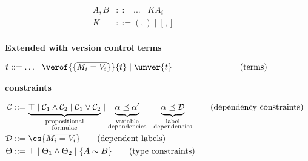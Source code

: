 \begin{figure}[tb]
\begin{minipage}{\textwidth}
\begin{minipage}{.52\textwidth}
\begin{align*}
          \end{align*}
        \end{minipage}
        \begin{minipage}{.44\textwidth}
          \begin{align*}
            A, B & ::= ... \mid K \overline{A_i} \tag{types}\\
            K    & ::= (,) \mid [,] \tag{type constructors}\\
          \end{align*}
        \end{minipage}
    \end{minipage}
    \begin{minipage}{.9\textwidth}
        \medskip\textbf{Extended with version control terms}
    \end{minipage}
    \begin{minipage}{\textwidth}
        \vspace{-.5\baselineskip}
        \begin{minipage}{\textwidth}
          \begin{align*}
            t & ::= \ldots \mid \verof{\{\overline{M_i=V_i}\}}{t} \mid \unver{t}\hspace{6em}\tag{terms}
          \end{align*}
        \end{minipage}
    \end{minipage}
    \begin{minipage}{.9\textwidth}
        \medskip\textbf{\vlmini{} constraints}
    \end{minipage}
    \begin{minipage}{\textwidth}
      \vspace{-.5\baselineskip}
      \begin{align*}
        \mathcal{C} & ::= \underbrace{\top \mid \mathcal{C}_1 \land \mathcal{C}_2 \mid \mathcal{C}_1 \lor \mathcal{C}_2}_{\substack{\text{propositional}\\\text{formulae}}} \mid \underbrace{\vphantom{\mid}\alpha \preceq \alpha'}_{\substack{\text{variable}\\\text{dependencies}}} \mid \underbrace{\vphantom{\mid}\alpha \preceq \mathcal{D}}_{\substack{\text{label}\\\text{dependencies}}}\tag{dependency 
 constraints}\\
        \mathcal{D} & ::= \cs{\overline{M_i = V_i}} \tag{dependent labels}\\
        \Theta      & ::= \top \mid \Theta_1 \land \Theta_2 \mid \{A \sim B\} \tag{type constraints}

\end{align*}
\end{minipage}
\end{figure}
